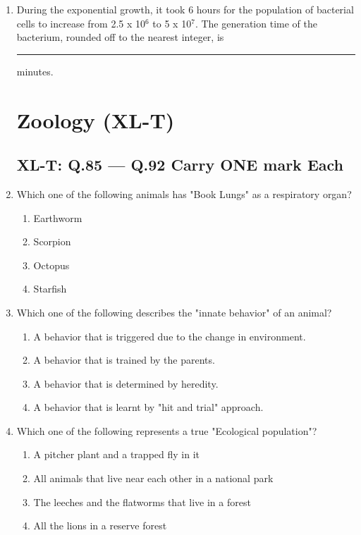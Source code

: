 \documentclass[journal,12pt,onecolumn]{IEEEtran}
\begin{document}
\begin{enumerate}
    \item During the exponential growth, it took 6 hours for the population of bacterial cells to increase from 2.5 x 10$^6$ to 5 x 10$^7$. The generation time of the bacterium, rounded off to the nearest integer, is \rule{1 cm}{0.15 mm} minutes.

\section*{Zoology (XL-T)}
\subsection*{XL-T: Q.85 --- Q.92 Carry ONE mark Each}

    \item Which one of the following animals has "Book Lungs" as a respiratory organ?
    \begin{enumerate}
        \item Earthworm
        \item Scorpion
        \item Octopus
        \item Starfish
    \end{enumerate}

    \item Which one of the following describes the "innate behavior" of an animal?
    \begin{enumerate}
        \item A behavior that is triggered due to the change in environment.
        \item A behavior that is trained by the parents.
        \item A behavior that is determined by heredity.
        \item A behavior that is learnt by "hit and trial" approach.
    \end{enumerate}

    \item Which one of the following represents a true "Ecological population"?
    \begin{enumerate}
        \item A pitcher plant and a trapped fly in it
        \item All animals that live near each other in a national park
        \item The leeches and the flatworms that live in a forest
        \item All the lions in a reserve forest
    \end{enumerate}


\end{enumerate}
\end{document}

